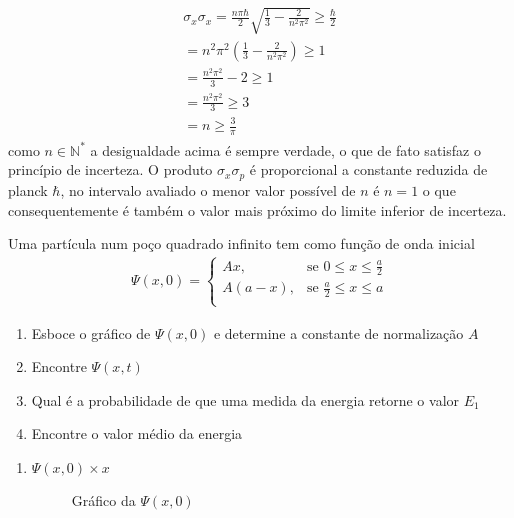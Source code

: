 \begin{prob}
\begin{sol}
\begin{align}
			\begin{split}
				\sigma_{x} \sigma_{x} = \frac{n \pi \hbar}{2}\sqrt{\frac{1}{3}-\frac{2}{n^{2} \pi^{2}}}\geq \frac{\hbar}{2}\\
				=n^{2} \pi^{2}\left(\frac{1}{3}-\frac{2}{n^{2} \pi^{2}}\right)\geq 1\\
				=\frac{n^{2} \pi^{2}}{3}-2\geq 1\\
				=\frac{n^{2} \pi^{2}}{3}\geq 3\\
				=n\geq \frac{3}{\pi}
			\end{split}
		\end{align}
		como $n\in\mathbb{N^{*}}$ a desigualdade acima é sempre verdade, o que de fato satisfaz o princípio de incerteza. O produto $\sigma_{x} \sigma_{p}$ é proporcional a constante reduzida de planck $\hbar$, no intervalo avaliado o menor valor possível de $n$ é $n=1$ o que consequentemente é também o valor mais próximo do limite inferior de incerteza.


	\end{sol}
\end{prob}
\begin{prob}
	Uma partícula num poço quadrado infinito tem como função de onda inicial
	\begin{eqnarray*}
		\Psi(x,0)=
		\begin{cases}
			Ax, &\text{se $0\leq x \leq \frac{a}{2}$}\\
			A \left(a-x\right), &\text{se $\frac{a}{2}\leq x\leq a$}\\
		\end{cases}
	\end{eqnarray*}
	\begin{enumerate}[label=\alph *)]
		\item Esboce o gráfico de $\Psi(x,0)$ e determine a constante de normalização $A$
		\item Encontre $\Psi(x,t)$
		\item Qual é a probabilidade de que uma medida da energia retorne o valor $E_{1}$
		\item Encontre o valor médio da energia
	\end{enumerate}
	\begin{sol}
		\begin{enumerate}[label=\alph *)]
			\item $\Psi(x,0)\times x$ 
				\begin{figure}[ht!]
					\centering
					
					\caption{Gráfico da $\Psi(x,0)$}
					\label{fig:pltQ05a}
				\end{figure}
		\end{enumerate}

	\end{sol}
\end{prob}

